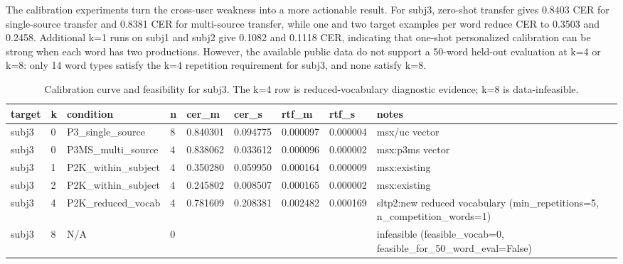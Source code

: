 The calibration experiments turn the cross-user weakness into a more actionable result. For subj3, zero-shot transfer gives 0.8403 CER for single-source transfer and 0.8381 CER for multi-source transfer, while one and two target examples per word reduce CER to 0.3503 and 0.2458. Additional k=1 runs on subj1 and subj2 give 0.1082 and 0.1118 CER, indicating that one-shot personalized calibration can be strong when each word has two productions. However, the available public data do not support a 50-word held-out evaluation at k=4 or k=8: only 14 word types satisfy the k=4 repetition requirement for subj3, and none satisfy k=8.


\begin{table}[t]
\centering
\caption{Calibration curve and feasibility for subj3. The k=4 row is reduced-vocabulary diagnostic evidence; k=8 is data-infeasible.}
\label{tab:kshot_curve}
\begin{tabular}{lllllllll}
\hline
target & k & condition & n & cer_m & cer_s & rtf_m & rtf_s & notes \\
\hline
subj3 & 0 & P3_single_source & 8 & 0.840301 & 0.094775 & 0.000097 & 0.000004 & msx/uc vector \\
subj3 & 0 & P3MS_multi_source & 4 & 0.838062 & 0.033612 & 0.000096 & 0.000002 & msx:p3ms vector \\
subj3 & 1 & P2K_within_subject & 4 & 0.350280 & 0.059950 & 0.000164 & 0.000009 & msx:existing \\
subj3 & 2 & P2K_within_subject & 4 & 0.245802 & 0.008507 & 0.000165 & 0.000002 & msx:existing \\
subj3 & 4 & P2K_reduced_vocab & 4 & 0.781609 & 0.208381 & 0.002482 & 0.000169 & sltp2:new reduced vocabulary (min_repetitions=5, n_competition_words=1) \\
subj3 & 8 & N/A & 0 &  &  &  &  & infeasible (feasible_vocab=0, feasible_for_50_word_eval=False) \\
\hline
\end{tabular}
\end{table}

